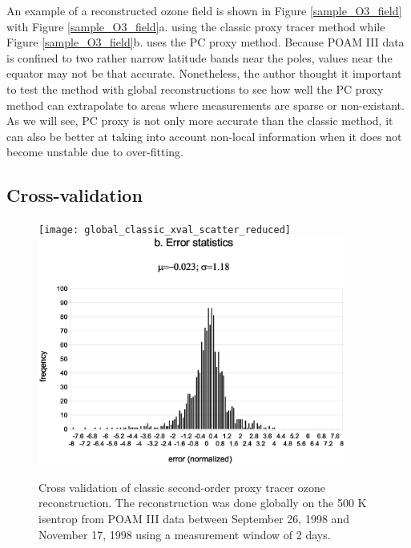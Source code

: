 An example of a reconstructed ozone field is shown in Figure \ref{sample_O3_field}
with Figure \ref{sample_O3_field}a. using the classic proxy tracer method
while Figure \ref{sample_O3_field}b. uses the PC proxy method.
Because POAM III data is confined to two rather narrow latitude bands near
the poles, values near the equator may not be that accurate.
Nonetheless, the author thought it important to test the method with global
reconstructions to see how well the PC proxy method can extrapolate
to areas where measurements are sparse or non-existant.
As we will see, PC proxy is not only more accurate than the classic method,
it can also be better at taking into account non-local information
when it does not become unstable due to over-fitting.

\subsection{Cross-validation}

\label{cross_validation}

\begin{figure}
  \centering
  \texttt{[image: global\_classic\_xval\_scatter\_reduced]}
  \includegraphics[width=0.9\textwidth]{global_classic_xval_error}
  \caption{Cross validation of classic second-order proxy tracer ozone reconstruction. The reconstruction was done globally on the 500 K isentrop from POAM III data between September 26, 1998 and November 17, 1998 using a measurement window of 2 days.}
  \label{classic_cross_validation}
\end{figure}

